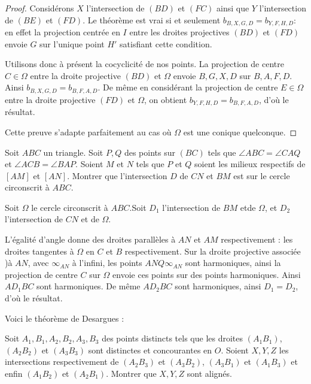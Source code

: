 \begin{proof}
Considérons $X$ l'intersection de $(BD)$ et $(FC)$ ainsi que $Y$ l'intersection de $(BE)$ et $(FD)$. Le théorème est vrai si et seulement $b_{B,X,G,D}=b_{Y,F,H,D}$: en effet la projection centrée en $I$ entre les droites projectives $(BD)$ et $(FD)$ envoie $G$ sur l'unique point $H'$ satisfiant cette condition.

\medskip

Utilisons donc à présent la cocyclicité de nos points. La projection de centre $C\in \Omega$ entre la droite projective $(BD)$ et $\Omega$ envoie $B,G,X,D$ sur $B,A,F,D$. Ainsi $b_{B,X,G,D}=b_{B,F,A,D}$. De même en considérant la projection de centre $E\in \Omega$ entre la droite projective $(FD)$ et $\Omega$, on obtient $b_{Y,F,H,D}=b_{B,F,A,D}$, d'où le résultat.

\medskip

Cette preuve s'adapte parfaitement au cas où $\Omega$ est une conique quelconque.
\end{proof}

\begin{exo}
Soit $ABC$ un triangle. Soit $P,Q$ des points sur $(BC)$ tels que $\angle ABC=\angle  CAQ$ et $\angle ACB=\angle BAP$. Soient $M$ et $N$ tels que $P$ et $Q$ soient les milieux respectifs de $[AM]$ et $[AN]$. Montrer que l'intersection $D$ de $CN$ et $BM$ est sur le cercle circonscrit à $ABC$.
\end{exo}

\begin{sol}
Soit $\Omega$ le cercle circonscrit à $ABC$.Soit $D_1$ l'intersection de $BM$ etde $\Omega$, et $D_2$ l'intersection de $CN$ et de $\Omega$.

\medskip

L'égalité d'angle donne des droites parallèles à $AN$ et $AM$ respectivement : les droites tangentes à $\Omega$ en $C$ et $B$ respectivement. Sur la droite projective associée )à $AN$, avec $\infty_{AN}$ à l'infini, les points $ANQ\infty_{AN}$ sont harmoniques, ainsi la projection de centre $C$ sur $\Omega$ envoie ces points sur des points harmoniques. Ainsi $AD_1BC$ sont harmoniques. De même $AD_2BC$ sont harmoniques, ainsi $D_1=D_2$, d'où le résultat.
\end{sol}

Voici le théorème de Desargues :

\begin{thm}
Soit $A_1,B_1,A_2,B_2,A_3,B_3$ des points distincts tels que les droites $(A_1B_1)$,$(A_2B_2)$ et $(A_3B_3)$ sont distinctes et concourantes en $O$. Soient $X,Y,Z$ les intersections respectivement de $(A_2B_3)$ et $(A_3B_2)$, $(A_3B_1)$ et $(A_1B_3)$ et enfin $(A_1B_2)$ et $(A_2B_1)$. Montrer que $X,Y,Z$ sont alignés.
\end{thm}

